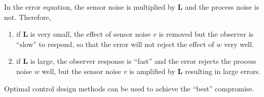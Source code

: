 In the error equation, the sensor noise is multiplied by $\mathbf{L}$ and the process noise is not. Therefore,
\begin{enumerate}
	\item if $\mathbf{L}$ is very small, the effect of sensor noise $v$ is removed but the observer is ``slow'' to respond, so that the error will not reject the effect of $w$ very well.
	\item if $\mathbf{L}$ is large, the observer response is ``fast'' and the error rejects the process noise $w$ well, but the sensor noise $v$ is amplified by $\mathbf{L}$ resulting in large errors.
\end{enumerate}

Optimal control design methods can be used to achieve the ``best'' compromise.

\endinput

